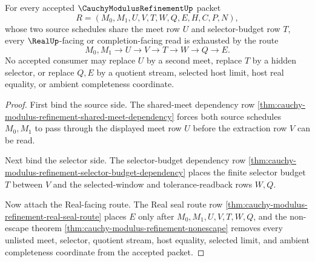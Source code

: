\begin{theorem}
\label{thm:cauchy-modulus-refinement-selector-budget-meet-exhaustion}
For every accepted $\CauchyModulusRefinementUp$ packet
$$
R=(M_0,M_1,U,V,T,W,Q,E,H,C,P,N),
$$
whose two source schedules share the meet row $U$ and selector-budget row $T$, every $\RealUp$-facing or completion-facing read is exhausted by the route
$$
M_0,M_1 \longrightarrow U \longrightarrow V \longrightarrow T \longrightarrow W \longrightarrow Q \longrightarrow E.
$$
No accepted consumer may replace $U$ by a second meet, replace $T$ by a hidden selector, or replace $Q,E$ by a quotient stream, selected host limit, host real equality, or ambient completeness coordinate.
\end{theorem}
\begin{proof}
First bind the source side. The shared-meet dependency row \autoref{thm:cauchy-modulus-refinement-shared-meet-dependency} forces both source schedules $M_0,M_1$ to pass through the displayed meet row $U$ before the extraction row $V$ can be read.

Next bind the selector side. The selector-budget dependency row \autoref{thm:cauchy-modulus-refinement-selector-budget-dependency} places the finite selector budget $T$ between $V$ and the selected-window and tolerance-readback rows $W,Q$.

Now attach the Real-facing route. The Real seal route row \autoref{thm:cauchy-modulus-refinement-real-seal-route} places $E$ only after $M_0,M_1,U,V,T,W,Q$, and the non-escape theorem \autoref{thm:cauchy-modulus-refinement-nonescape} removes every unlisted meet, selector, quotient stream, host equality, selected limit, and ambient completeness coordinate from the accepted packet.
\end{proof}
